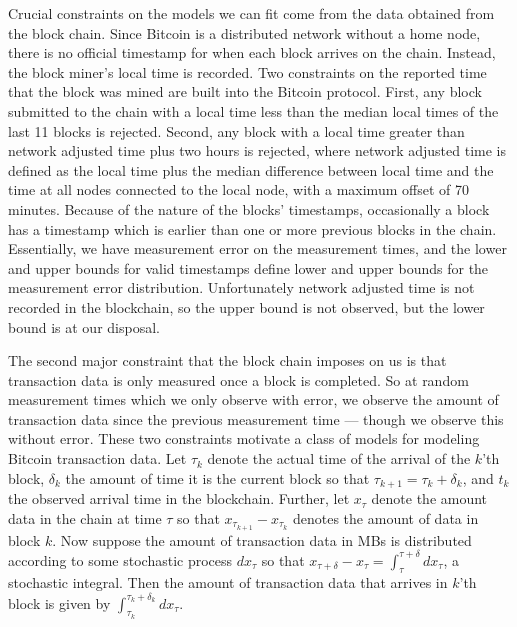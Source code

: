 \documentclass{article}
\begin{document}
Crucial constraints on the models we can fit come from the data obtained from the block chain. Since Bitcoin is a distributed network without a home node, there is no official timestamp for when each block arrives on the chain. Instead, the block miner's local time is recorded. Two constraints on the reported time that the block was mined are built into the Bitcoin protocol. First, any block submitted to the chain with a local time less than the median local times of the last 11 blocks is rejected. Second, any block with a local time greater than network adjusted time plus two hours is rejected, where network adjusted time is defined as the local time plus the median difference between local time and the time at all nodes connected to the local node, with a maximum offset of 70 minutes. Because of the nature of the blocks' timestamps, occasionally a block has a timestamp which is earlier than one or more previous blocks in the chain. Essentially, we have measurement error on the measurement times, and the lower and upper bounds for valid timestamps define lower and upper bounds for the measurement error distribution. Unfortunately network adjusted time is not recorded in the blockchain, so the upper bound is not observed, but the lower bound is at our disposal.

The second major constraint that the block chain imposes on us is that transaction data is only measured once a block is completed. So at random measurement times which we only observe with error, we observe the amount of transaction data since the previous measurement time --- though we observe this without error. These two constraints motivate a class of models for modeling Bitcoin transaction data. Let $\tau_k$ denote the actual time of the arrival of the $k$'th block, $\delta_k$ the amount of time it is the current block so that $\tau_{k+1}=\tau_k + \delta_k$, and $t_k$ the observed arrival time in the blockchain. Further, let $x_\tau$ denote the amount data in the chain at time $\tau$ so that $x_{\tau_{k+1}} - x_{\tau_k}$ denotes the amount of data in block $k$. Now suppose the amount of transaction data in MBs is distributed according to some stochastic process $dx_\tau$ so that $x_{\tau + \delta} - x_\tau = \int_\tau^{\tau + \delta}dx_\tau$, a stochastic integral. Then the amount of transaction data that arrives in $k$'th block is given by $\int_{\tau_k}^{\tau_{k}+\delta_k}dx_\tau$. 
\end{document}
